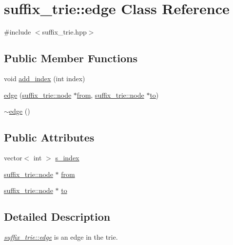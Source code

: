 \hypertarget{classsuffix__trie_1_1edge}{\section{suffix\+\_\+trie\+:\+:edge Class Reference}
\label{classsuffix__trie_1_1edge}
}


{\ttfamily \#include $<$suffix\+\_\+trie.\+hpp$>$}

\subsection*{Public Member Functions}
\begin{DoxyCompactItemize}
\item 
void \hyperlink{classsuffix__trie_1_1edge_a680b647d002f8bcc652e1c018f0c657b}{add\+\_\+index} (int index)
\item 
\hyperlink{classsuffix__trie_1_1edge_aa6f56affb895ee66dc772945a6ebb5ff}{edge} (\hyperlink{classsuffix__trie_1_1node}{suffix\+\_\+trie\+::node} $\ast$\hyperlink{classsuffix__trie_1_1edge_ae89e6815dd581516c8d4284814334263}{from}, \hyperlink{classsuffix__trie_1_1node}{suffix\+\_\+trie\+::node} $\ast$\hyperlink{classsuffix__trie_1_1edge_a356e813f739d3559b031bdcb6da6da76}{to})
\item 
\hyperlink{classsuffix__trie_1_1edge_a10c602847a0349ea05d7aff29493d4e7}{$\sim$edge} ()
\end{DoxyCompactItemize}
\subsection*{Public Attributes}
\begin{DoxyCompactItemize}
\item 
vector$<$ int $>$ \hyperlink{classsuffix__trie_1_1edge_ac5864e7428c08ec02d50039a5dd4eaa6}{s\+\_\+index}
\item 
\hyperlink{classsuffix__trie_1_1node}{suffix\+\_\+trie\+::node} $\ast$ \hyperlink{classsuffix__trie_1_1edge_ae89e6815dd581516c8d4284814334263}{from}
\item 
\hyperlink{classsuffix__trie_1_1node}{suffix\+\_\+trie\+::node} $\ast$ \hyperlink{classsuffix__trie_1_1edge_a356e813f739d3559b031bdcb6da6da76}{to}
\end{DoxyCompactItemize}


\subsection{Detailed Description}
{\itshape \hyperlink{classsuffix__trie_1_1edge}{suffix\+\_\+trie\+::edge}} is an edge in the trie. 

